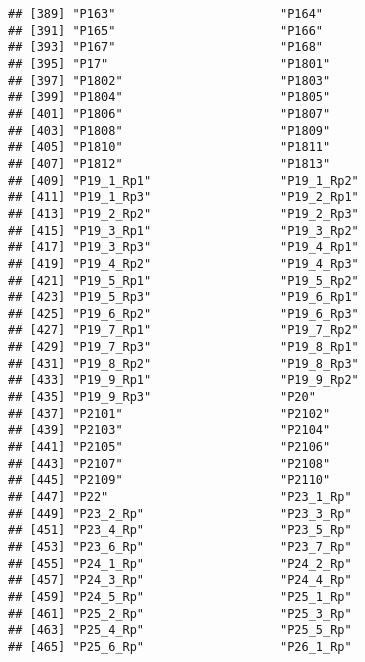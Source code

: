 \documentclass[
]{article}
\begin{document}
\begin{verbatim}
## [389] "P163"                       "P164"                      
## [391] "P165"                       "P166"                      
## [393] "P167"                       "P168"                      
## [395] "P17"                        "P1801"                     
## [397] "P1802"                      "P1803"                     
## [399] "P1804"                      "P1805"                     
## [401] "P1806"                      "P1807"                     
## [403] "P1808"                      "P1809"                     
## [405] "P1810"                      "P1811"                     
## [407] "P1812"                      "P1813"                     
## [409] "P19_1_Rp1"                  "P19_1_Rp2"                 
## [411] "P19_1_Rp3"                  "P19_2_Rp1"                 
## [413] "P19_2_Rp2"                  "P19_2_Rp3"                 
## [415] "P19_3_Rp1"                  "P19_3_Rp2"                 
## [417] "P19_3_Rp3"                  "P19_4_Rp1"                 
## [419] "P19_4_Rp2"                  "P19_4_Rp3"                 
## [421] "P19_5_Rp1"                  "P19_5_Rp2"                 
## [423] "P19_5_Rp3"                  "P19_6_Rp1"                 
## [425] "P19_6_Rp2"                  "P19_6_Rp3"                 
## [427] "P19_7_Rp1"                  "P19_7_Rp2"                 
## [429] "P19_7_Rp3"                  "P19_8_Rp1"                 
## [431] "P19_8_Rp2"                  "P19_8_Rp3"                 
## [433] "P19_9_Rp1"                  "P19_9_Rp2"                 
## [435] "P19_9_Rp3"                  "P20"                       
## [437] "P2101"                      "P2102"                     
## [439] "P2103"                      "P2104"                     
## [441] "P2105"                      "P2106"                     
## [443] "P2107"                      "P2108"                     
## [445] "P2109"                      "P2110"                     
## [447] "P22"                        "P23_1_Rp"                  
## [449] "P23_2_Rp"                   "P23_3_Rp"                  
## [451] "P23_4_Rp"                   "P23_5_Rp"                  
## [453] "P23_6_Rp"                   "P23_7_Rp"                  
## [455] "P24_1_Rp"                   "P24_2_Rp"                  
## [457] "P24_3_Rp"                   "P24_4_Rp"                  
## [459] "P24_5_Rp"                   "P25_1_Rp"                  
## [461] "P25_2_Rp"                   "P25_3_Rp"                  
## [463] "P25_4_Rp"                   "P25_5_Rp"                  
## [465] "P25_6_Rp"                   "P26_1_Rp"                  

\end{verbatim}
\end{document}
